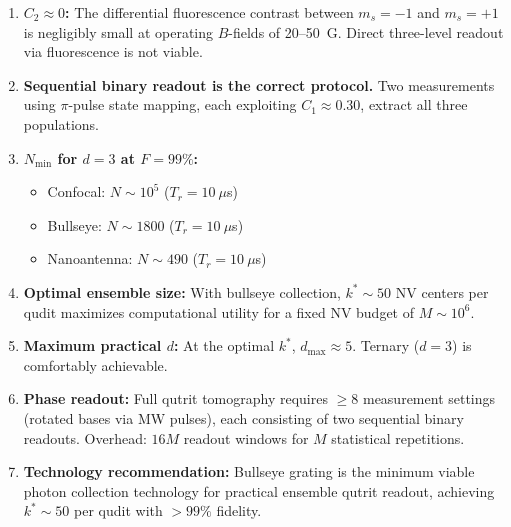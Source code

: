 \documentclass[11pt,letterpaper]{article}
\begin{document}
\begin{enumerate}
  \item \textbf{$C_2 \approx 0$:} The differential fluorescence contrast
    between $m_s = -1$ and $m_s = +1$ is negligibly small at operating
    $B$-fields of 20--50~G.  Direct three-level readout via fluorescence
    is not viable.

  \item \textbf{Sequential binary readout is the correct protocol.}  Two
    measurements using $\pi$-pulse state mapping, each exploiting
    $C_1 \approx 0.30$, extract all three populations.

  \item \textbf{$N_{\min}$ for $d = 3$ at $F = 99\%$:}
    \begin{itemize}
      \item Confocal: $N \sim 10^5$ ($T_r = 10~\mu$s)
      \item Bullseye: $N \sim 1800$ ($T_r = 10~\mu$s)
      \item Nanoantenna: $N \sim 490$ ($T_r = 10~\mu$s)
    \end{itemize}

  \item \textbf{Optimal ensemble size:} With bullseye collection,
    $k^* \sim 50$ NV centers per qudit maximizes computational utility
    for a fixed NV budget of $M \sim 10^6$.

  \item \textbf{Maximum practical $d$:} At the optimal $k^*$,
    $d_{\max} \approx 5$.  Ternary ($d = 3$) is comfortably achievable.

  \item \textbf{Phase readout:} Full qutrit tomography requires $\geq 8$
    measurement settings (rotated bases via MW pulses), each consisting
    of two sequential binary readouts.  Overhead: $16M$ readout windows
    for $M$ statistical repetitions.

  \item \textbf{Technology recommendation:} Bullseye grating is the
    minimum viable photon collection technology for practical ensemble
    qutrit readout, achieving $k^* \sim 50$ per qudit with $> 99\%$
    fidelity.
\end{enumerate}


\end{document}
